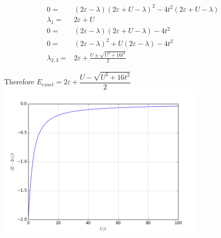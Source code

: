 \documentclass[10pt,fleqn]{article}
\newcommand{\eqar}[1]
{
  \begin{align*}
    #1
  \end{align*}
}
\newcommand{\paren}[1]{{\left({#1}\right)}}
\begin{document}
\subsection{}
\eqar{
  0=&\paren{2\varepsilon-\lambda}\paren{2\varepsilon+U-\lambda}^2-4t^2\paren{2\varepsilon+U-\lambda}\\
  \lambda_1=&2\varepsilon+U\\
  0=&\paren{2\varepsilon-\lambda}\paren{2\varepsilon+U-\lambda}-4t^2\\
  0=&\paren{2\varepsilon-\lambda}^2+U\paren{2\varepsilon-\lambda}-4t^2\\
  \lambda_{2,3}=&2\varepsilon+\frac{U\pm\sqrt{U^2+16t^2}}{2}
}
Therefore $E_{exact}=2\varepsilon+\dfrac{U-\sqrt{U^2+16t^2}}{2}$\\
\includegraphics[width=10cm]{4c.png}
\subsection{}
\end{document}
